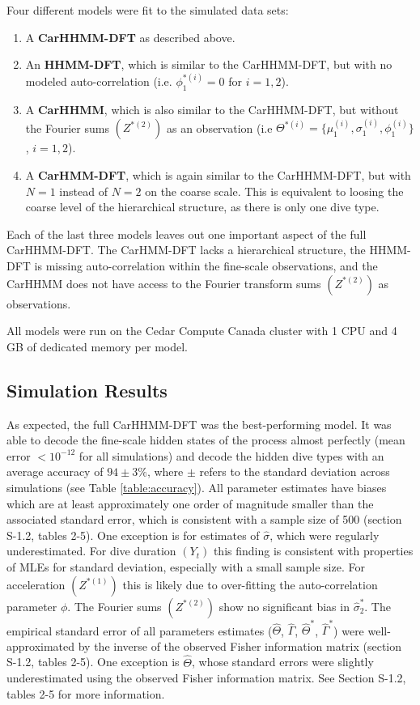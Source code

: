 Four different models were fit to the simulated data sets:
\begin{enumerate}
    \item A \textbf{CarHHMM-DFT} as described above.
    \item An \textbf{HHMM-DFT}, which is similar to the CarHHMM-DFT, but with no modeled auto-correlation \big(i.e. $\phi_1^{*(i)} = 0$ for $i = 1,2$\big).
    \item A \textbf{CarHHMM}, which is also similar to the CarHHMM-DFT, but without the Fourier sums $(Z^{*(2)})$ as an observation \big(i.e $\Theta^{*(i)} = \{\mu_1^{(i)},\sigma_1^{(i)},\phi_1^{(i)}\}$, $i = 1,2$\big).
    \item A \textbf{CarHMM-DFT}, which is again similar to the CarHHMM-DFT, but with $N=1$ instead of $N=2$ on the coarse scale. This is equivalent to loosing the coarse level of the hierarchical structure, as there is only one dive type.
\end{enumerate}
%
Each of the last three models leaves out one important aspect of the full CarHHMM-DFT. The CarHMM-DFT lacks a hierarchical structure, the HHMM-DFT is missing auto-correlation within the fine-scale observations, and the CarHHMM does not have access to the Fourier transform sums $(Z^{*(2)})$ as observations. 

All models were run on the Cedar Compute Canada cluster with 1 CPU and 4 GB of dedicated memory per model.

\subsection{Simulation Results}


As expected, the full CarHHMM-DFT was the best-performing model. It was able to decode the fine-scale hidden states of the process almost perfectly (mean error $< 10^{-12}$ for all simulations) and decode the hidden dive types with an average accuracy of $94 \pm 3 \%$, where $\pm$ refers to the standard deviation across simulations (see Table \ref{table:accuracy}). All parameter estimates have biases which are at least approximately one order of magnitude smaller than the associated standard error, which is consistent with a sample size of 500 (section S-1.2, tables 2-5). One exception is for estimates of $\hat \sigma$, which were regularly underestimated. For dive duration $(Y_t)$ this finding is consistent with properties of MLEs for standard deviation, especially with a small sample size. For acceleration $(Z^{*(1)})$ this is likely due to over-fitting the auto-correlation parameter $\phi$. The Fourier sums $(Z^{*(2)})$ show no significant bias in $\hat \sigma^*_2$. The empirical standard error of all parameters estimates ($\hat \Theta$, $\hat \Gamma$, $\hat \Theta^*$, $\hat \Gamma^*$) were well-approximated by the inverse of the observed Fisher information matrix (section S-1.2, tables 2-5). One exception is $\hat \Theta$, whose standard errors were slightly underestimated using the observed Fisher information matrix. 
See Section S-1.2, tables 2-5 for more information.

